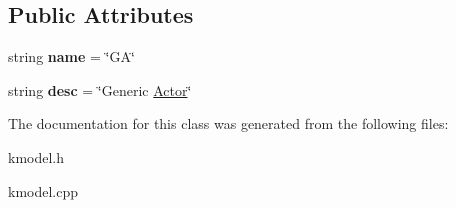 \subsection*{Public Attributes}
\begin{DoxyCompactItemize}
\item 
\hypertarget{class_k_base_1_1_actor_abbb5242ce42cc3982d0c14eed3cac8d7}{string {\bfseries name} = \char`\"{}G\-A\char`\"{}}\label{class_k_base_1_1_actor_abbb5242ce42cc3982d0c14eed3cac8d7}

\item 
\hypertarget{class_k_base_1_1_actor_a88f1b91e10499b9868f3640b48421e2e}{string {\bfseries desc} = \char`\"{}Generic \hyperlink{class_k_base_1_1_actor}{Actor}\char`\"{}}\label{class_k_base_1_1_actor_a88f1b91e10499b9868f3640b48421e2e}

\end{DoxyCompactItemize}


The documentation for this class was generated from the following files\-:\begin{DoxyCompactItemize}
\item 
kmodel.\-h\item 
kmodel.\-cpp\end{DoxyCompactItemize}
